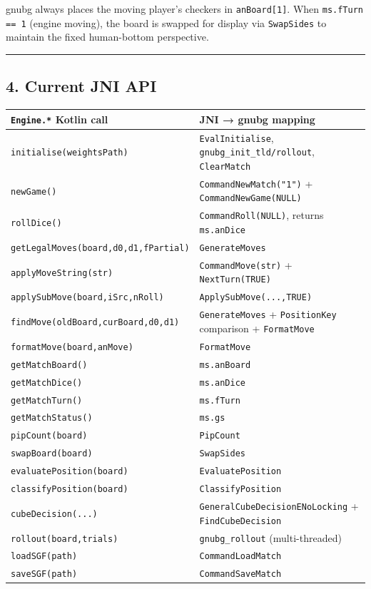 \documentclass[11pt,a4paper]{article}
\begin{document}
gnubg always places the moving player's checkers in \texttt{anBoard[1]}.
When \texttt{ms.fTurn == 1} (engine moving), the board is swapped for
display via \texttt{SwapSides} to maintain the fixed human-bottom
perspective.

\begin{center}\rule{0.5\linewidth}{0.5pt}\end{center}

\subsection{4. Current JNI API}\label{jni-api}

\begin{longtable}[]{@{}ll@{}}
\toprule\noalign{}
\texttt{Engine.*} Kotlin call & JNI → gnubg mapping \\
\midrule\noalign{}
\endhead
\bottomrule\noalign{}
\endlastfoot
\texttt{initialise(weightsPath)} & \texttt{EvalInitialise}, \texttt{gnubg\_init\_tld/rollout}, \texttt{ClearMatch} \\
\texttt{newGame()} & \texttt{CommandNewMatch("1")} + \texttt{CommandNewGame(NULL)} \\
\texttt{rollDice()} & \texttt{CommandRoll(NULL)}, returns \texttt{ms.anDice} \\
\texttt{getLegalMoves(board,d0,d1,fPartial)} & \texttt{GenerateMoves} \\
\texttt{applyMoveString(str)} & \texttt{CommandMove(str)} + \texttt{NextTurn(TRUE)} \\
\texttt{applySubMove(board,iSrc,nRoll)} & \texttt{ApplySubMove(...,TRUE)} \\
\texttt{findMove(oldBoard,curBoard,d0,d1)} & \texttt{GenerateMoves} + \texttt{PositionKey} comparison + \texttt{FormatMove} \\
\texttt{formatMove(board,anMove)} & \texttt{FormatMove} \\
\texttt{getMatchBoard()} & \texttt{ms.anBoard} \\
\texttt{getMatchDice()} & \texttt{ms.anDice} \\
\texttt{getMatchTurn()} & \texttt{ms.fTurn} \\
\texttt{getMatchStatus()} & \texttt{ms.gs} \\
\texttt{pipCount(board)} & \texttt{PipCount} \\
\texttt{swapBoard(board)} & \texttt{SwapSides} \\
\texttt{evaluatePosition(board)} & \texttt{EvaluatePosition} \\
\texttt{classifyPosition(board)} & \texttt{ClassifyPosition} \\
\texttt{cubeDecision(...)} & \texttt{GeneralCubeDecisionENoLocking} + \texttt{FindCubeDecision} \\
\texttt{rollout(board,trials)} & \texttt{gnubg\_rollout} (multi-threaded) \\
\texttt{loadSGF(path)} & \texttt{CommandLoadMatch} \\
\texttt{saveSGF(path)} & \texttt{CommandSaveMatch} \\
\end{longtable}
\end{document}
